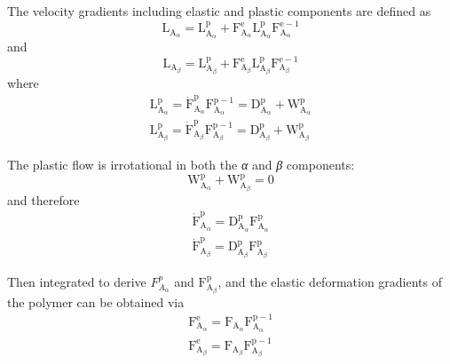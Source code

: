 \documentclass{article}
\begin{document}
The velocity gradients including elastic and plastic components are defined as
\begin{equation*}
\mathrm{L}_{\mathrm{A}_\alpha} = \mathrm{L}^{\mathrm{p}}_{\mathrm{A}_\alpha} + \mathrm{F}^{\mathrm{e}}_{\mathrm{A}_\alpha}\mathrm{L}^{\mathrm{p}}_{\mathrm{A}_\alpha}\mathrm{F}^{\mathrm{e}-1}_{\mathrm{A}_\alpha} \tag{9}
\end{equation*}
\noindent and
\begin{equation*}
\mathrm{L}_{\mathrm{A}_\beta} = \mathrm{L}^{\mathrm{p}}_{\mathrm{A}_\beta} + \mathrm{F}^{\mathrm{e}}_{\mathrm{A}_\beta}\mathrm{L}^{\mathrm{p}}_{\mathrm{A}_\beta}\mathrm{F}^{\mathrm{e}-1}_{\mathrm{A}_\beta} \tag{10}
\end{equation*}
\noindent where
\begin{gather*}
\mathrm{L}^{\mathrm{p}}_{\mathrm{A}_\alpha} = \dot{\mathrm{F}}^{\mathrm{p}}_{\mathrm{A}_\alpha}\mathrm{F}^{\mathrm{p}-1}_{\mathrm{A}_\alpha} = \mathrm{D}^{\mathrm{p}}_{\mathrm{A}_\alpha} + \mathrm{W}^{\mathrm{p}}_{\mathrm{A}_\alpha} \tag{11}\\
\mathrm{L}^{\mathrm{p}}_{\mathrm{A}_\beta} = \dot{\mathrm{F}}^{\mathrm{p}}_{\mathrm{A}_\beta}\mathrm{F}^{\mathrm{p}-1}_{\mathrm{A}_\beta} = \mathrm{D}^{\mathrm{p}}_{\mathrm{A}_\beta} + \mathrm{W}^{\mathrm{p}}_{\mathrm{A}_\beta} \tag{12}
\end{gather*}

The plastic flow is irrotational in both the \emph{α} and \emph{β} components:
\begin{equation*}
\mathrm{W}^{\mathrm{p}}_{\mathrm{A}_\alpha} + \mathrm{W}^{\mathrm{p}}_{\mathrm{A}_\beta} = 0 \tag{13}
\end{equation*}
\noindent and therefore
\begin{gather*}
\dot{\mathrm{F}}^{\mathrm{p}}_{\mathrm{A}_\alpha} = \mathrm{D}^{\mathrm{p}}_{\mathrm{A}_\alpha}\mathrm{F}^{\mathrm{p}}_{\mathrm{A}_\alpha} \tag{14}\\
\dot{\mathrm{F}}^{\mathrm{p}}_{\mathrm{A}_\beta} = \mathrm{D}^{\mathrm{p}}_{\mathrm{A}_\beta}\mathrm{F}^{\mathrm{p}}_{\mathrm{A}_\beta} \tag{15}
\end{gather*}

Then integrated to derive $F^{p}_{A_\alpha}$ and $\mathrm{F}^{\mathrm{p}}_{\mathrm{A}_\beta}$, and the elastic deformation gradients of the polymer can be obtained via
\begin{gather*}
\mathrm{F}^{\mathrm{e}}_{\mathrm{A}_\alpha} = \mathrm{F}_{\mathrm{A}_\alpha}\mathrm{F}^{\mathrm{p}-1}_{\mathrm{A}_\alpha} \tag{16}\\
\mathrm{F}^{\mathrm{e}}_{\mathrm{A}_\beta} = \mathrm{F}_{\mathrm{A}_\beta}\mathrm{F}^{\mathrm{p}-1}_{\mathrm{A}_\beta} \tag{17}
\end{gather*}
\end{document}
